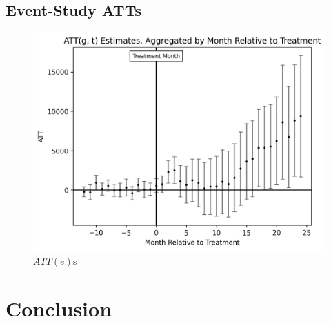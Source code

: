 \documentclass[12pt]{article}
\begin{document}
    \subsection{Event-Study ATTs}
        \begin{figure}[H]
            \centering
            \includegraphics{output/DiD/figures/att_gt_estimates_event_study.png}
            \caption{$ATT(e)$s}
            \label{fig:my_label}
        \end{figure}


\section{Conclusion} \label{sec:conclusion}



\singlespacing
\setlength\bibsep{0pt}





\clearpage

\onehalfspacing










\end{document}
